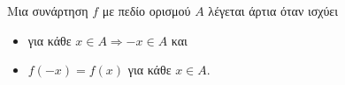 Μια συνάρτηση $ f $ με πεδίο ορισμού $ A $ λέγεται άρτια όταν ισχύει
\begin{itemize}
\item για κάθε $ x\in A\Rightarrow -x\in A $ και 
\item $ f(-x)=f(x) $ για κάθε $ x\in A $.
\end{itemize}
